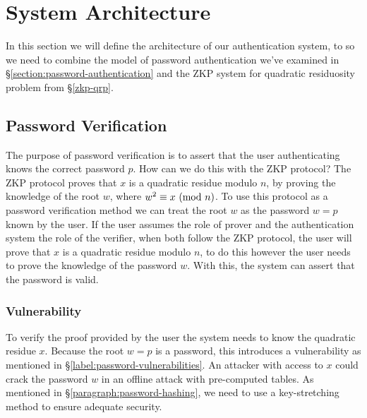 

\section{System Architecture}
\label{label:protocol-design}
In this section we will define the architecture of our authentication system, to so we need to combine the model of password authentication we've examined in \S\ref{section:password-authentication} and the ZKP system for quadratic residuosity problem from \S\ref{zkp-qrp}.

\subsection{Password Verification}
\label{section:zkp-password-verification}
The purpose of password verification is to assert that the user authenticating knows the correct password $p$. 
How can we do this with the ZKP protocol?
The ZKP protocol proves that $x$ is a quadratic residue modulo $n$, by proving the knowledge of the root $w$, where  $w^2 \equiv x \ (\mathrm{mod}\ n)$.
To use this protocol as a password verification method we can treat the root $w$ as the password $w = p$ known by the user.
If the user assumes the role of prover and the authentication system the role of the verifier, when both follow the ZKP protocol, the user will prove that $x$ is a quadratic residue modulo $n$, to do this however the user needs to prove the knowledge of the password $w$. 
With this, the system can assert that the password is valid.


\subsubsection{Vulnerability}
To verify the proof provided by the user the system needs to know the quadratic residue $x$.
Because the root $w = p$ is a password, this introduces a vulnerability as mentioned in \S\ref{label:password-vulnerabilities}.
An attacker with access to $x$ could crack the password $w$ in an offline attack with pre-computed tables.
As mentioned in \S\ref{paragraph:password-hashing}, we need to use a key-stretching method to ensure adequate security.







